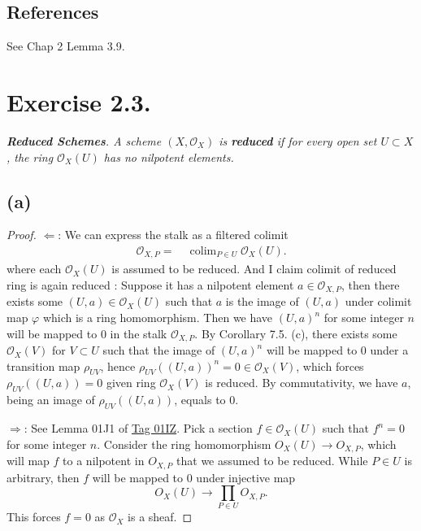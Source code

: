 \subsection{References}

See \cite{qing2006algebraic} Chap 2 Lemma 3.9.

\section{Exercise 2.3.}
\textit{\textbf{Reduced Schemes}. A scheme $(X,\mathcal O_X)$ is \textbf{reduced} if for every open set $U\subset X$, the ring $\mathcal O_X(U)$ has no nilpotent elements.}

\subsection{(a)}

\begin{proof}
    $\Leftarrow$:
    We can express the stalk as a filtered colimit 
    \begin{align*}
        \mathcal O_{X,P}
        =&~ \operatorname{colim}_{P\in U}\mathcal O_X(U).
    \end{align*} where each $\mathcal O_X(U)$ is assumed to be reduced. 
    And I claim colimit of reduced ring is again reduced :
    Suppose it has a nilpotent element $a\in\mathcal O_{X,P}$, then there exists some $(U,a)\in \mathcal O_X(U)$ such that $a$ is the image of $(U,a)$ under colimit map $\varphi$ which is a ring homomorphism. Then we have $(U,a)^n$ for some integer $n$ will be mapped to $0$ in the stalk $\mathcal O_{X,P}$. By \cite{altman2013term} Corollary 7.5. (c), there exists some $\mathcal O_X(V)$ for $V\subset U$ such that the image of $(U,a)^n$ will be mapped to $0$ under a transition map $\rho_{UV}$, hence $\rho_{UV}((U,a))^n=0\in\mathcal O_X(V)$, which forces $\rho_{UV}((U,a))=0$ given ring $\mathcal O_X(V)$ is reduced. By commutativity, we have $a$, being an image of $\rho_{UV}((U,a))$, equals to $0$. 

    $\Rightarrow$: 
    See Lemma 01J1 of \href{https://stacks.math.columbia.edu/tag/01IZ}{Tag 01IZ}. 
    Pick a section $f\in\mathcal O_X(U)$ such that $f^n=0$ for some integer $n$. 
    Consider the ring homomorphism $O_X(U)\to O_{X,P}$, which will map $f$ to a nilpotent in $O_{X,P}$ that we assumed to be reduced. While $P\in U$ is arbitrary, then $f$ will be mapped to $0$ under injective map 
    \[O_X(U)\to \prod_{P\in U}O_{X,P}.\] This forces $f=0$ as $\mathcal O_X$ is a sheaf.
\end{proof} 

